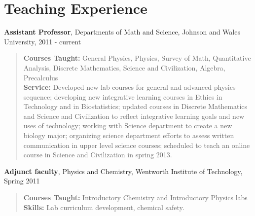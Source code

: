 \documentclass[letterpaper]{article}
\renewenvironment{itemize}{
  \begin{list}{}{
    \setlength{\leftmargin}{1em}
  }
}{
  \end{list}
}
\begin{document}
\section*{Teaching Experience}
\begin{itemize}
        \item \textbf{Assistant Professor}, Departments of Math and Science, Johnson and Wales University, 2011 - current 
\vspace{-0.5em}
\begin{quote}\textbf{Courses Taught:} General Physics, Physics, Survey of Math, Quantitative Analysis, Discrete Mathematics, Science and Civilization, Algebra, Precalculus\\
	\textbf{Service:} Developed new lab courses for general and advanced physics sequence; developing new integrative learning courses in Ethics in Technology and in Biostatistics; updated courses in Discrete Mathematics and Science and Civilization to reflect integrative learning goals and new uses of technology; working with Science department to create a new biology major; organizing science department efforts to assess written communication in upper level science courses; scheduled to teach an online course in Science and Civilization in spring 2013. 
\end{quote} 

        \item \textbf{Adjunct faculty}, Physics and Chemistry, Wentworth Institute of Technology, Spring 2011
\vspace{-0.5em} 
\begin{quote}\textbf{Courses Taught:} Introductory Chemistry and Introductory Physics labs\\
        \textbf{Skills:} Lab curriculum development, chemical safety.
 \end{quote}


\end{itemize}
\end{document}

